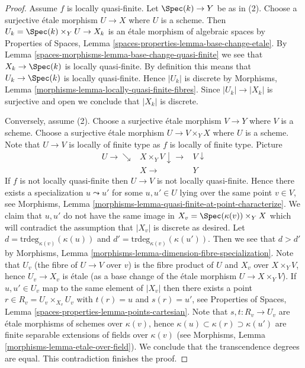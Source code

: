 \begin{proof}
Assume $f$ is locally quasi-finite. Let $\Spec(k) \to Y$ be as
in (2). Choose a surjective \'etale morphism $U \to X$ where $U$ is a scheme.
Then $U_k = \Spec(k) \times_Y U \to X_k$ is an
\'etale morphism of algebraic spaces by
Properties of Spaces, Lemma \ref{spaces-properties-lemma-base-change-etale}.
By
Lemma \ref{spaces-morphisms-lemma-base-change-quasi-finite}
we see that $X_k \to \Spec(k)$ is locally quasi-finite. By
definition this means that $U_k \to \Spec(k)$ is locally
quasi-finite. Hence $|U_k|$ is discrete by
Morphisms, Lemma \ref{morphisms-lemma-locally-quasi-finite-fibres}.
Since $|U_k| \to |X_k|$ is surjective and open we conclude that $|X_k|$
is discrete.

\medskip\noindent
Conversely, assume (2). Choose a surjective \'etale morphism $V \to Y$
where $V$ is a scheme. Choose a surjective \'etale morphism
$U \to V \times_Y X$ where $U$ is a scheme.
Note that $U \to V$ is locally of finite type as $f$ is locally of finite type.
Picture
$$
\begin{array}{ccc}U \longrightarrow\searrow & X \times_Y V \downarrow\longrightarrow & V \downarrow \\  & X \longrightarrow & Y\end{array}
$$
If $f$ is not locally quasi-finite then $U \to V$ is not locally quasi-finite.
Hence there exists a specialization $u \leadsto u'$ for some $u, u' \in U$
lying over the same point $v \in V$, see
Morphisms, Lemma \ref{morphisms-lemma-quasi-finite-at-point-characterize}.
We claim that $u, u'$ do not have the same image in
$X_v = \Spec(\kappa(v)) \times_Y X$
which will contradict the assumption that $|X_v|$ is discrete as desired.
Let $d = \text{trdeg}_{\kappa(v)}(\kappa(u))$ and
$d' = \text{trdeg}_{\kappa(v)}(\kappa(u'))$.
Then we see that $d > d'$ by
Morphisms, Lemma \ref{morphisms-lemma-dimension-fibre-specialization}.
Note that $U_v$ (the fibre of $U \to V$ over $v$) is the fibre product of
$U$ and $X_v$ over $X \times_Y V$, hence $U_v \to X_v$ is \'etale (as a
base change of the \'etale morphism $U \to X \times_Y V$). If
$u, u' \in U_v$ map to the same element of $|X_v|$ then there exists a point
$r \in R_v = U_v \times_{X_v} U_v$ with $t(r) = u$ and $s(r) = u'$, see
Properties of Spaces, Lemma \ref{spaces-properties-lemma-points-cartesian}.
Note that $s, t : R_v \to U_v$ are \'etale morphisms of schemes
over $\kappa(v)$, hence $\kappa(u) \subset \kappa(r) \supset \kappa(u')$
are finite separable extensions of fields over $\kappa(v)$ (see
Morphisms, Lemma \ref{morphisms-lemma-etale-over-field}).
We conclude that the transcendence degrees are equal.
This contradiction finishes the proof.
\end{proof}

